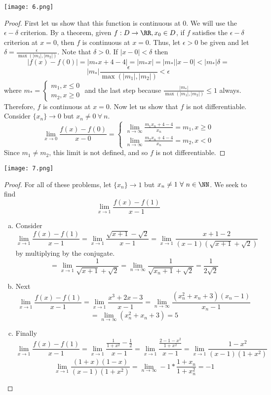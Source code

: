 \documentclass[12pt]{scrartcl}
\begin{document}
\newpage 

\texttt{[image: 6.png]}

\begin{proof}
  First let us show that this function is continuous at $0$. We will use the $\epsilon-\delta$ criterion. 
  By a theorem, given $f: D \to \RR, x_0 \in D$, if $f$ satisfies the $\epsilon-\delta$ criterion at 
  $x=0$, then $f$ is continuous at $x=0$. Thus, let $\epsilon > 0$ be given and let $\delta = \frac{\epsilon}{\max(|m_1|, |m_2|)}$. 
  Note that $\delta > 0$. If 
  $|x - 0| < \delta$ then 
  \[|f(x) - f(0)| = |m_*x + 4 - 4| = |m_* x| = |m_*||x-0| < |m_*|\delta = \] 
  \[|m_*|\frac{\epsilon}{\max(|m_1|, |m_2|)}< \epsilon\]
  where $m_* = \begin{cases}
    m_1, x \leq 0\\
    m_2, x \geq 0
  \end{cases}$ and the last step because $\frac{|m_*|}{\max(|m_1|, |m_2|)} \leq 1$ always. Therefore, $f$ is continuous at $x = 0$. Now let us show that $f$ is not 
  differentiable. Consider $\{x_n\} \to 0$ but $x_n \neq 0 \ \forall \ n$. 
  \[\lim_{x\to 0}\frac{f(x) - f(0)}{x - 0} = \begin{cases}
    \underset{n\to\infty}{\lim} \frac{m_1 x_n + 4 - 4}{x_n} = m_1, x \geq 0\\
    \underset{n\to\infty}{\lim} \frac{m_2x_n + 4 - 4}{x_n} = m_2, x < 0
  \end{cases}\]
  Since $m_1 \neq m_2$, this limit is not defined, and so $f$ is not differentiable.
\end{proof}

\newpage 

\texttt{[image: 7.png]}

\begin{proof}
  
\hfill

For all of these problems, let $\{x_n\} \to 1$ but $x_n \neq 1 \ \forall \ n \in \NN$. 
We seek to find
\[\lim_{x\to 1} \frac{f(x) - f(1)}{x-1}\]

\begin{enumerate}[a.]
  \item Consider 
  \[\lim_{x\to 1}\frac{f(x) - f(1)}{x-1} = \lim_{x\to 1} \frac{\sqrt{x + 1} - \sqrt{2}}{x - 1} = \lim_{x\to 1} \frac{x + 1 - 2}{(x-1)(\sqrt{x+1} + \sqrt{2})}\]
  by multiplying by the conjugate.
  \[ = \lim_{x\to 1} \frac{1}{\sqrt{x + 1} + \sqrt{2}} = \lim_{n\to\infty} \frac{1}{\sqrt{x_n + 1} + \sqrt{2}} = \frac{1}{2\sqrt{2}}\]
  \item Next 
  \[\lim_{x\to 1}\frac{f(x) - f(1)}{x - 1} = \lim_{x \to 1} \frac{x^3 + 2x - 3}{x - 1} = \lim_{n\to\infty} \frac{(x_n^2 + x_n + 3)(x_n - 1)}{x_n - 1}\]
  \[ = \lim_{n\to\infty}(x^2_n + x_n + 3) = 5\]
  \item Finally 
  \[\lim_{x\to 1}\frac{f(x) - f(1)}{x-1} = \lim_{x\to 1} \frac{\frac{1}{1+x^2} - \frac{1}{2}}{x-1} = \lim_{x\to 1} \frac{\frac{2 - 1 - x^2}{1 + x^2}}{x-1} = \lim_{x\to 1}\frac{1-x^2}{(x-1)(1+x^2)}\]
  \[\lim_{x\to 1} \frac{(1+x)(1-x)}{(x-1)(1+x^2)} = \lim_{n\to\infty}-1 * \frac{1 + x_n}{1 + x_n^2} = -1\]
\end{enumerate}
\end{proof}
\end{document}
